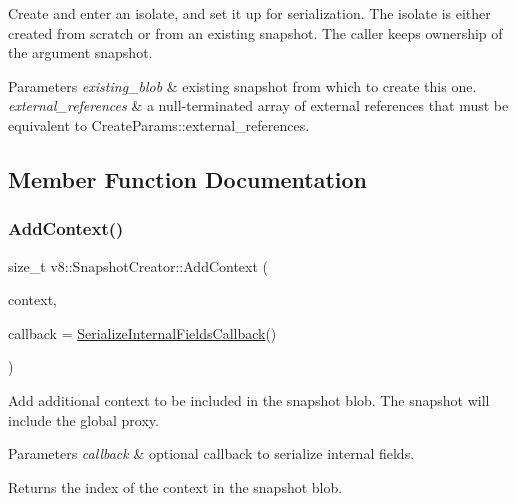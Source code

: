 Create and enter an isolate, and set it up for serialization. The isolate is either created from scratch or from an existing snapshot. The caller keeps ownership of the argument snapshot. 
\begin{DoxyParams}{Parameters}
{\em existing\+\_\+blob} & existing snapshot from which to create this one. \\
\hline
{\em external\+\_\+references} & a null-\/terminated array of external references that must be equivalent to Create\+Params\+::external\+\_\+references. \\
\hline
\end{DoxyParams}


\subsection{Member Function Documentation}
\mbox{\label{classv8_1_1SnapshotCreator_aefaa477c494707e73b493047f4711a0a}} 
\subsubsection{\texorpdfstring{Add\+Context()}{AddContext()}}
{\footnotesize\ttfamily size\+\_\+t v8\+::\+Snapshot\+Creator\+::\+Add\+Context (\begin{DoxyParamCaption}\item[{\mbox{\hyperlink{classv8_1_1Local}{Local}}$<$ \mbox{\hyperlink{classv8_1_1Context}{Context}} $>$}]{context,  }\item[{\mbox{\hyperlink{structv8_1_1SerializeInternalFieldsCallback}{Serialize\+Internal\+Fields\+Callback}}}]{callback = {\ttfamily \mbox{\hyperlink{structv8_1_1SerializeInternalFieldsCallback}{Serialize\+Internal\+Fields\+Callback}}()} }\end{DoxyParamCaption})}

Add additional context to be included in the snapshot blob. The snapshot will include the global proxy.


\begin{DoxyParams}{Parameters}
{\em callback} & optional callback to serialize internal fields.\\
\hline
\end{DoxyParams}
\begin{DoxyReturn}{Returns}
the index of the context in the snapshot blob. 
\end{DoxyReturn}
\mbox{\label{classv8_1_1SnapshotCreator_a7388b4c160b8d1b6b7ff23833bafb339}} 
